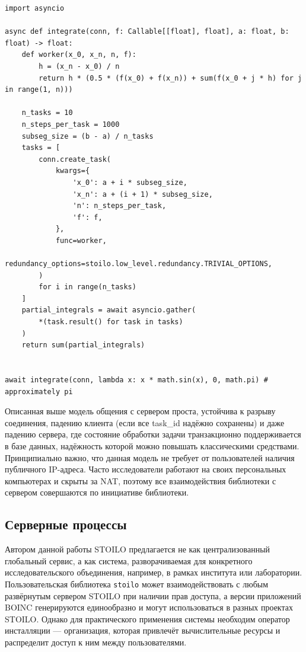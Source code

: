 \documentclass[a4paper,12pt]{extarticle}
\begin{document}
\begin{lstlisting}[caption={Пример запуска параллельно исполняющихся задач.}, label={list:async}]
import asyncio

async def integrate(conn, f: Callable[[float], float], a: float, b: float) -> float:
    def worker(x_0, x_n, n, f):
        h = (x_n - x_0) / n
        return h * (0.5 * (f(x_0) + f(x_n)) + sum(f(x_0 + j * h) for j in range(1, n)))

    n_tasks = 10
    n_steps_per_task = 1000
    subseg_size = (b - a) / n_tasks
    tasks = [
        conn.create_task(
            kwargs={
                'x_0': a + i * subseg_size,
                'x_n': a + (i + 1) * subseg_size,
                'n': n_steps_per_task,
                'f': f,
            },
            func=worker,
            redundancy_options=stoilo.low_level.redundancy.TRIVIAL_OPTIONS,
        )
        for i in range(n_tasks)
    ]
    partial_integrals = await asyncio.gather(
        *(task.result() for task in tasks)
    )
    return sum(partial_integrals)


await integrate(conn, lambda x: x * math.sin(x), 0, math.pi) # approximately pi
\end{lstlisting}

Описанная выше модель общения с сервером проста, устойчива к разрыву соединения, падению клиента (если все task\_id надёжно сохранены) и даже падению сервера, где состояние обработки задачи транзакционно поддерживается в базе данных, надёжность которой можно повышать классическими средствами.
Принципиально важно, что данная модель не требует от пользователей наличия публичного IP-адреса.
Часто исследователи работают на своих персональных компьютерах и скрыты за NAT, поэтому все взаимодействия библиотеки с сервером совершаются по инициативе библиотеки.

\subsection{Серверные процессы}

Автором данной работы STOILO предлагается не как централизованный глобальный сервис, а как система, разворачиваемая для конкретного исследовательского объединения, например, в рамках института или лаборатории.
Пользовательская библиотека \texttt{stoilo} может взаимодействовать с любым развёрнутым сервером STOILO при наличии прав доступа, а версии приложений BOINC генерируются единообразно и могут использоваться в разных проектах STOILO.
Однако для практического применения системы необходим оператор инсталляции — организация, которая привлечёт вычислительные ресурсы и распределит доступ к ним между пользователями.
\end{document}
